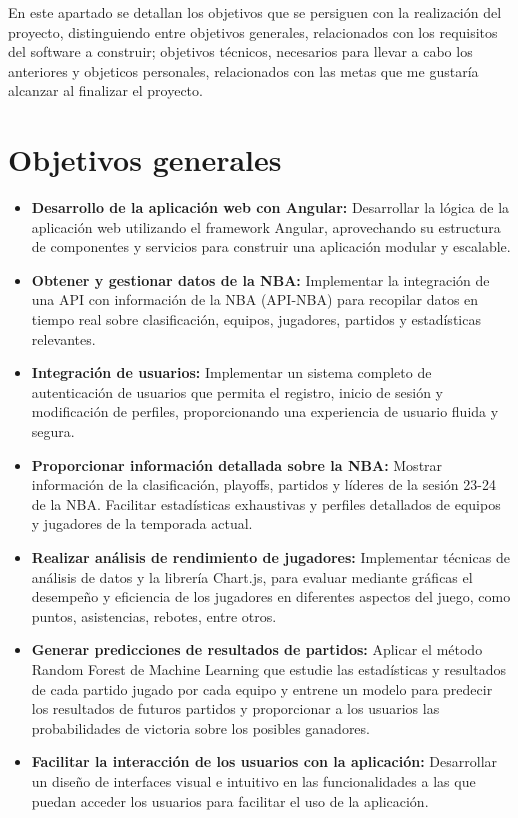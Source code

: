 
En este apartado se detallan los objetivos que se persiguen con la realización del proyecto, distinguiendo entre objetivos generales, relacionados con los requisitos del software a construir; objetivos técnicos, necesarios para llevar a cabo los anteriores y objeticos personales, relacionados con las metas que me gustaría alcanzar al finalizar el proyecto.

\section{Objetivos generales}
\begin{itemize}
\tightlist
    \item 
        \textbf{Desarrollo de la aplicación web con Angular:} Desarrollar la lógica de la aplicación web utilizando el framework Angular, aprovechando su estructura de componentes y servicios para construir una aplicación modular y escalable.
    \item
        \textbf{Obtener y gestionar datos de la NBA:} Implementar la integración de una API con información de la NBA (API-NBA) para recopilar datos en tiempo real sobre clasificación, equipos, jugadores, partidos y estadísticas relevantes. 
    \item 
        \textbf{Integración de usuarios:} Implementar un sistema completo de autenticación de usuarios que permita el registro, inicio de sesión y modificación de perfiles, proporcionando una experiencia de usuario fluida y segura.
    \item 
        \textbf{Proporcionar información detallada sobre la NBA:} Mostrar información de la clasificación, playoffs, partidos y líderes de la sesión 23-24 de la NBA. Facilitar estadísticas exhaustivas y perfiles detallados de equipos y jugadores de la temporada actual.
    \item 
        \textbf{Realizar análisis de rendimiento de jugadores:} Implementar técnicas de análisis de datos y la librería Chart.js, para evaluar mediante gráficas el desempeño y eficiencia de los jugadores en diferentes aspectos del juego, como puntos, asistencias, rebotes, entre otros.
    \item 
        \textbf{Generar predicciones de resultados de partidos:} Aplicar el método Random Forest de Machine Learning que estudie las estadísticas y resultados de cada partido jugado por cada equipo y entrene un modelo para predecir los resultados de futuros partidos y proporcionar a los usuarios las probabilidades de victoria sobre los posibles ganadores.
    \item 
        \textbf{Facilitar la interacción de los usuarios con la aplicación:} Desarrollar un diseño de interfaces visual e intuitivo en las funcionalidades a las que puedan acceder los usuarios para facilitar el uso de la aplicación.
\end{itemize}

